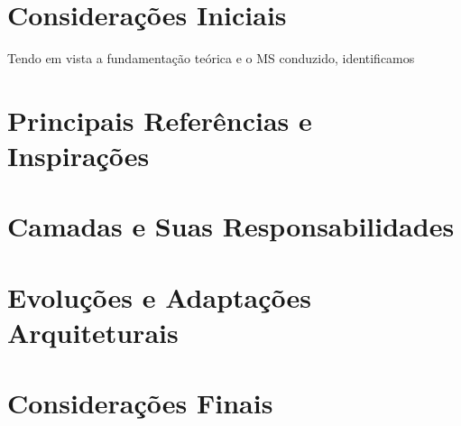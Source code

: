 \section{Considerações Iniciais}

Tendo em vista a fundamentação teórica e o MS conduzido, identificamos 

\section{Principais Referências e Inspirações}

\section{Camadas e Suas Responsabilidades}

\section{Evoluções e Adaptações Arquiteturais}

\section{Considerações Finais}